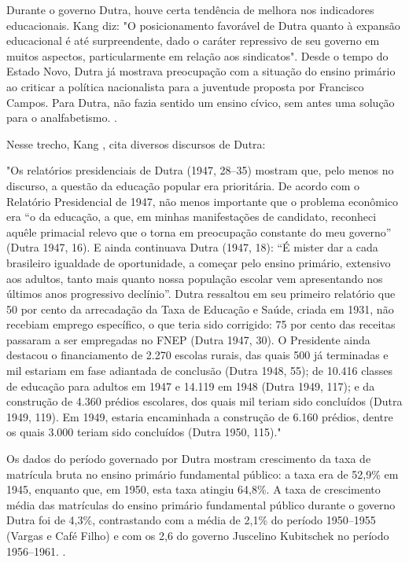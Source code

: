 \documentclass[a4paper,12pt]{article}
\begin{document}
Durante o governo Dutra, houve certa tendência de melhora nos indicadores educacionais. Kang \cite*{kang} diz: "O posicionamento favorável de Dutra quanto à expansão educacional é até surpreendente, dado o caráter repressivo de seu governo em muitos aspectos, particularmente em relação aos sindicatos".
Desde o tempo do Estado Novo, Dutra já mostrava preocupação com a situação do ensino primário ao criticar a política nacionalista para a juventude proposta por Francisco Campos. Para Dutra, não fazia sentido um ensino cívico, sem antes uma solução para o analfabetismo. \cite{capanema}.

Nesse trecho, Kang \cite*[p. 40-41]{kang}, cita diversos discursos de Dutra:

"Os relatórios presidenciais de Dutra (1947, 28–35) mostram que, pelo menos no discurso, a questão da educação popular era prioritária. De acordo com o Relatório Presidencial de 1947, não menos importante que o problema econômico era “o da educação, a que, em minhas manifestações de candidato, reconheci aquêle primacial relevo que o torna em preocupação constante do meu governo” (Dutra 1947, 16). E ainda continuava Dutra (1947, 18): “É mister dar a cada brasileiro igualdade de oportunidade, a começar pelo ensino primário, extensivo aos adultos, tanto mais quanto nossa população escolar vem apresentando nos últimos anos progressivo declínio”. Dutra ressaltou em seu primeiro relatório que 50 por cento da arrecadação da Taxa de Educação e Saúde, criada em 1931, não recebiam emprego específico, o que teria sido corrigido: 75 por cento das receitas passaram a ser empregadas no FNEP (Dutra 1947, 30). O Presidente ainda destacou o financiamento de 2.270 escolas rurais, das quais 500 já terminadas e mil estariam em fase adiantada de conclusão (Dutra 1948, 55); de 10.416 classes de educação para adultos em 1947 e 14.119 em 1948 (Dutra 1949, 117); e da construção de 4.360 prédios escolares, dos quais mil teriam sido concluídos (Dutra 1949, 119). Em 1949, estaria encaminhada a construção de 6.160 prédios, dentre os quais 3.000 teriam sido concluídos (Dutra 1950, 115)."

Os dados do período governado por Dutra mostram crescimento da taxa de matrícula bruta no ensino primário fundamental público: a taxa era de 52,9\% em 1945, enquanto que, em 1950, esta taxa atingiu 64,8\%.
A taxa de crescimento média das matrículas do ensino primário fundamental público durante o governo Dutra foi de 4,3\%, contrastando com a média de 2,1\% do período 1950–1955 (Vargas e Café Filho) e com os 2,6\* do governo Juscelino Kubitschek no período 1956–1961. \cite{kang}.
\end{document}
